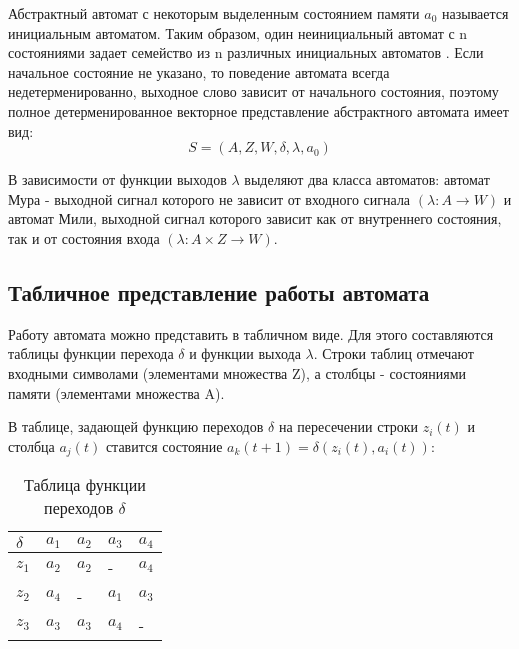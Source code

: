 \pagebreak

Абстрактный автомат с некоторым выделенным состоянием памяти $a_0$ называется инициальным автоматом.
Таким образом, один неинициальный автомат с n состояниями задает семейство из n различных инициальных автоматов \cite{automats}.
Если начальное состояние не указано, то поведение автомата всегда недетерменированно, выходное слово зависит от начального состояния,
поэтому полное детерменированное векторное представление абстрактного автомата имеет вид:
%
\begin{equation*}
    S = (A, Z, W, \delta, \lambda, a_0)
\end{equation*}

В зависимости от функции выходов $\lambda$ выделяют два класса автоматов: 
автомат Мура - выходной сигнал которого не зависит от входного сигнала $(\lambda: A \rightarrow W)$
и автомат Мили, выходной сигнал которого зависит как от внутреннего состояния, так и от состояния входа $(\lambda: A \times Z \rightarrow W)$.

\subsection{Табличное представление работы автомата}

Работу автомата можно представить в табличном виде. Для этого составляются таблицы функции перехода $\delta$ и функции выхода $\lambda$.
Строки таблиц отмечают входными символами (элементами множества Z), а столбцы - состояниями памяти (элементами множества A).

В таблице, задающей функцию переходов $\delta$ на пересечении строки $z_i(t)$ и столбца $a_j(t)$ 
ставится состояние $a_k(t+1) = \delta(z_i(t), a_i(t))$:

\begin{table}[h!]
    \caption{Таблица функции переходов $\delta$}
    \begin{tabular}{| >{\centering}m{} 
                    | >{\centering}m{} 
                    | >{\centering}m{} 
                    | >{\centering}m{} 
                    | >{\centering\arraybackslash}m{}|} 
        \hline $\delta$  &  $a_1$  &  $a_2$  &  $a_3$  &  $a_4$ \\
        \hline  $z_1$    &  $a_2$  &  $a_2$  &    -    &  $a_4$ \\
        \hline  $z_2$    &  $a_4$  &    -    &  $a_1$  &  $a_3$ \\        
        \hline  $z_3$    &  $a_3$  &  $a_3$  &  $a_4$  &    -   \\
        \hline
    \end{tabular}
    \label{tab:task4:table1}
\end{table}

